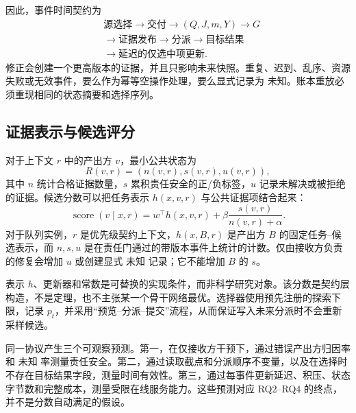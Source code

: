 \documentclass[UTF8,twocolumn]{ctexart}
\newcommand{\unknown}{\textsc{未知}}
\begin{document}
因此，事件时间契约为
\begin{equation}
\begin{aligned}
&\text{源选择}\rightarrow\text{交付}\rightarrow(Q,J,m,Y)\rightarrow G\\
&\rightarrow\text{证据发布}\rightarrow\text{分派}\rightarrow\text{目标结果}\\
&\rightarrow\text{延迟的仅选中项更新}.
\end{aligned}
\label{eq:timeline}
\end{equation}
修正会创建一个更高版本的证据，并且只影响未来快照。重复、迟到、乱序、资源失败或无效事件，要么作为幂等空操作处理，要么显式记录为 \unknown{}。账本重放必须重现相同的状态摘要和选择序列。

\subsection{证据表示与候选评分}
对于上下文 $r$ 中的产出方 $v$，最小公共状态为
\begin{equation}
 R(v,r)=(n(v,r),s(v,r),u(v,r)),
 \label{eq:state}
\end{equation}
其中 $n$ 统计合格证据数量，$s$ 累积责任安全的正/负标签，$u$ 记录未解决或被拒绝的证据。候选分数可以把任务表示 $h(x,v,r)$ 与公共证据项结合起来：
\begin{equation}
 \operatorname{score}(v\mid x,r)=w^\top h(x,v,r)+\beta\frac{s(v,r)}{n(v,r)+\alpha}.
 \label{eq:score}
\end{equation}
对于队列实例，$r$ 是优先级契约上下文，$h(x,B,r)$ 是产出方 $B$ 的固定任务--候选表示，而 $n,s,u$ 是在责任门通过的带版本事件上统计的计数。仅由接收方负责的修复会增加 $u$ 或创建显式 \unknown{} 记录；它不能增加 $B$ 的 $s$。

表示 $h$、更新器和常数是可替换的实现条件，而非科学研究对象。该分数是契约层构造，不是定理，也不主张某一个骨干网络最优。选择器使用预先注册的探索下限，记录 $p_t$，并采用“预览--分派--提交”流程，从而保证写入未来分派时不会重新采样候选。

同一协议产生三个可观察预测。第一，在仅接收方干预下，通过错误产出方归因率和 \unknown{} 率测量责任安全。第二，通过读取截点和分派顺序不变量，以及在选择时不存在目标结果字段，测量时间有效性。第三，通过每事件更新延迟、积压、状态字节数和完整成本，测量受限在线服务能力。这些预测对应 RQ2--RQ4 的终点，并不是分数自动满足的假设。
\end{document}
